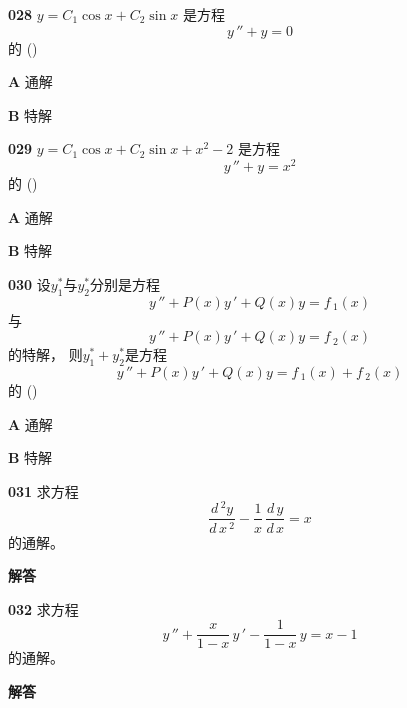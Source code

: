 \documentclass[a4paper,10pt]{article} %
\begin{document}
\textheight


\par\noindent \textbf{028} \quad 
$y=C_1\cos x+C_2\sin x$
是方程
$$y\,''+y=0$$
的
\hfill (\quad\quad\quad)
\par\noindent \textbf{A} \quad 通解
\par\noindent \textbf{B} \quad 特解





\textheight


\par\noindent \textbf{029} \quad 
$y=C_1\cos x+C_2\sin x+x^2-2$
是方程
$$y\,''+y=x^2$$
的
\hfill (\quad\quad\quad)
\par\noindent \textbf{A} \quad 通解
\par\noindent \textbf{B} \quad 特解





\textheight


\par\noindent \textbf{030} \quad 设$y_1^*$与$y_2^*$分别是方程
$$y\,''+P(x)y\,'+Q(x)y=f\,_1(x)$$
与
$$y\,''+P(x)y\,'+Q(x)y=f\,_2(x)$$
的特解， 则$y_1^*+y_2^*$是方程
$$y\,''+P(x)y\,'+Q(x)y=f\,_1(x)+f\,_2(x)$$
的
\hfill (\quad\quad\quad)
\par\noindent \textbf{A} \quad 通解
\par\noindent \textbf{B} \quad 特解





\textheight


\par\noindent \textbf{031} \quad 求方程
$$\frac{d\,^2y}{d\,x\,^2}-\frac{1}{x}\,\frac{d\,y}{d\,x}=x$$
的通解。
\par\noindent \textbf{ 解答}





\textheight


\par\noindent \textbf{032} \quad 求方程
$$y\,''+\frac{x}{1-x}\,y\,'-\frac{1}{1-x}\,y=x-1$$
的通解。
\par\noindent \textbf{ 解答}
\end{document}
